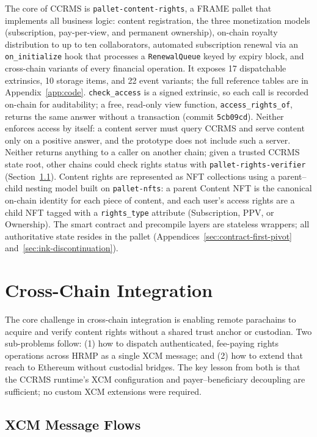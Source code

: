 The core of CCRMS is \texttt{pallet-content-rights}, a FRAME pallet that implements all business logic: content registration, the three monetization models (subscription, pay-per-view, and permanent ownership), on-chain royalty distribution to up to ten collaborators, automated subscription renewal via an \texttt{on\_initialize} hook that processes a \texttt{RenewalQueue} keyed by expiry block, and cross-chain variants of every financial operation. It exposes 17 dispatchable extrinsics, 10 storage items, and 22 event variants; the full reference tables are in Appendix~\ref{app:code}. \texttt{check\_access} is a signed extrinsic, so each call is recorded on-chain for auditability; a free, read-only view function, \texttt{access\_rights\_of}, returns the same answer without a transaction (commit \texttt{5cb09cd}). Neither enforces access by itself: a content server must query CCRMS and serve content only on a positive answer, and the prototype does not include such a server. Neither returns anything to a caller on another chain; given a trusted CCRMS state root, other chains could check rights status with \texttt{pallet-rights-verifier} (Section~\ref{subsec:xcm-flows}). Content rights are represented as NFT collections using a parent--child nesting model built on \texttt{pallet-nfts}: a parent Content NFT is the canonical on-chain identity for each piece of content, and each user's access rights are a child NFT tagged with a \texttt{rights\_type} attribute (Subscription, PPV, or Ownership). The smart contract and precompile layers are stateless wrappers; all authoritative state resides in the pallet (Appendices~\ref{sec:contract-first-pivot} and~\ref{sec:ink-discontinuation}).

\section{Cross-Chain Integration}\label{sec:cross-chain-integration}

The core challenge in cross-chain integration is enabling remote parachains to acquire and verify content rights without a shared trust anchor or custodian. Two sub-problems follow: (1) how to dispatch authenticated, fee-paying rights operations across HRMP as a single XCM message; and (2) how to extend that reach to Ethereum without custodial bridges. The key lesson from both is that the CCRMS runtime's XCM configuration and payer--beneficiary decoupling are sufficient; no custom XCM extensions were required.

\subsection{XCM Message Flows}\label{subsec:xcm-flows}

